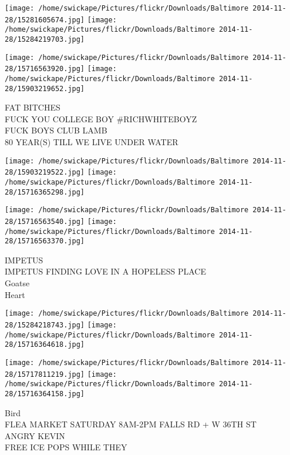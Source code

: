 \documentclass[10pt,letterpaper]{article}
\begin{document}
\texttt{[image: /home/swickape/Pictures/flickr/Downloads/Baltimore 2014-11-28/15281605674.jpg]}
\texttt{[image: /home/swickape/Pictures/flickr/Downloads/Baltimore 2014-11-28/15284219703.jpg]}

\texttt{[image: /home/swickape/Pictures/flickr/Downloads/Baltimore 2014-11-28/15716563920.jpg]}
\texttt{[image: /home/swickape/Pictures/flickr/Downloads/Baltimore 2014-11-28/15903219652.jpg]}

FAT BITCHES\\
FUCK YOU COLLEGE BOY \#RICHWHITEBOYZ\\
FUCK BOYS CLUB LAMB\\
80 YEAR(S) TILL WE LIVE UNDER WATER
\pagebreak

\texttt{[image: /home/swickape/Pictures/flickr/Downloads/Baltimore 2014-11-28/15903219522.jpg]}
\texttt{[image: /home/swickape/Pictures/flickr/Downloads/Baltimore 2014-11-28/15716365298.jpg]}

\texttt{[image: /home/swickape/Pictures/flickr/Downloads/Baltimore 2014-11-28/15716563540.jpg]}
\texttt{[image: /home/swickape/Pictures/flickr/Downloads/Baltimore 2014-11-28/15716563370.jpg]}

IMPETUS\\
IMPETUS FINDING LOVE IN A HOPELESS PLACE\\
Goatse\\
Heart
\pagebreak

\texttt{[image: /home/swickape/Pictures/flickr/Downloads/Baltimore 2014-11-28/15284218743.jpg]}
\texttt{[image: /home/swickape/Pictures/flickr/Downloads/Baltimore 2014-11-28/15716364618.jpg]}

\texttt{[image: /home/swickape/Pictures/flickr/Downloads/Baltimore 2014-11-28/15717811219.jpg]}
\texttt{[image: /home/swickape/Pictures/flickr/Downloads/Baltimore 2014-11-28/15716364158.jpg]}

Bird\\
FLEA MARKET SATURDAY 8AM{-}2PM FALLS RD + W 36TH ST\\
ANGRY KEVIN\\
FREE ICE POPS WHILE THEY
\pagebreak
\end{document}
